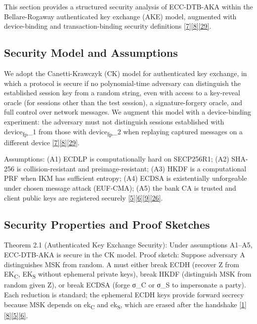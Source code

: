 \indent This section provides a structured security analysis of ECC-DTB-AKA within the Bellare-Rogaway authenticated key exchange (AKE) model, augmented with device-binding and transaction-binding security definitions \hyperref[ref:7]{[7]}\hyperref[ref:8]{[8]}\hyperref[ref:29]{[29]}.

\subsection{Security Model and Assumptions}

\indent We adopt the Canetti-Krawczyk (CK) model for authenticated key exchange, in which a protocol is secure if no polynomial-time adversary can distinguish the established session key from a random string, even with access to a key-reveal oracle (for sessions other than the test session), a signature-forgery oracle, and full control over network messages. We augment this model with a device-binding experiment: the adversary must not distinguish sessions established with device\textsubscript{fp}\_1 from those with device\textsubscript{fp}\_2 when replaying captured messages on a different device \hyperref[ref:7]{[7]}\hyperref[ref:8]{[8]}\hyperref[ref:29]{[29]}.

\indent Assumptions: (A1) ECDLP is computationally hard on SECP256R1; (A2) SHA-256 is collision-resistant and preimage-resistant; (A3) HKDF is a computational PRF when IKM has sufficient entropy; (A4) ECDSA is existentially unforgeable under chosen message attack (EUF-CMA); (A5) the bank CA is trusted and client public keys are registered securely \hyperref[ref:5]{[5]}\hyperref[ref:6]{[6]}\hyperref[ref:9]{[9]}\hyperref[ref:26]{[26]}.

\subsection{Security Properties and Proof Sketches}

\indent Theorem 2.1 (Authenticated Key Exchange Security): Under assumptions A1--A5, ECC-DTB-AKA is secure in the CK model. Proof sketch: Suppose adversary A distinguishes MSK from random. A must either break ECDH (recover Z from EK\textsubscript{C}, EK\textsubscript{S} without ephemeral private keys), break HKDF (distinguish MSK from random given Z), or break ECDSA (forge σ\_C or σ\_S to impersonate a party). Each reduction is standard; the ephemeral ECDH keys provide forward secrecy because MSK depends on ek\textsubscript{C} and ek\textsubscript{S}, which are erased after the handshake \hyperref[ref:1]{[1]}\hyperref[ref:8]{[8]}\hyperref[ref:5]{[5]}\hyperref[ref:6]{[6]}.

